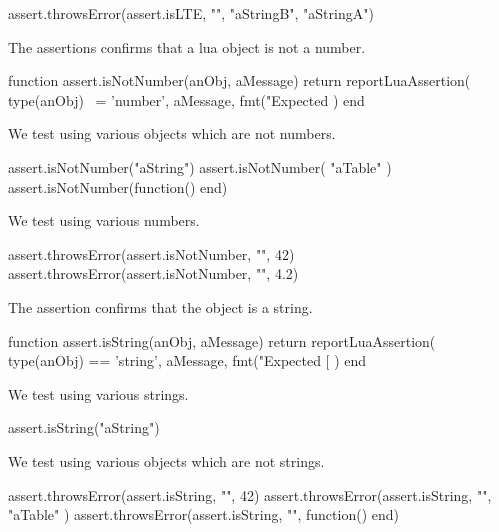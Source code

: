 \startLuaTest
  assert.throwsError(assert.isLTE, "", "aStringB", "aStringA")
\stopLuaTest

\stopTestCase

\stopTestSuite


The  assertions confirms that a lua object is not 
a number. 

\startLuaCode
function assert.isNotNumber(anObj, aMessage)
  return reportLuaAssertion(
    type(anObj) ~= 'number',
    aMessage,
    fmt("Expected %
  )
end
\stopLuaCode


We test using various objects which are not numbers. 

\startLuaTest
  assert.isNotNumber("aString")
  assert.isNotNumber({ "aTable" })
  assert.isNotNumber(function() end)
\stopLuaTest
\stopTestCase


We test using various numbers.

\startLuaTest
  assert.throwsError(assert.isNotNumber, "", 42)
  assert.throwsError(assert.isNotNumber, "", 4.2)
\stopLuaTest
\stopTestCase

\stopTestSuite


The  assertion confirms that the object is a string. 

\startLuaCode
function assert.isString(anObj, aMessage)
  return reportLuaAssertion(
    type(anObj) == 'string',
    aMessage,
    fmt("Expected [%
  )
end
\stopLuaCode


We test using various strings.

\startLuaTest
  assert.isString("aString")
\stopLuaTest
\stopTestCase


We test using various objects which are not strings. 

\startLuaTest
  assert.throwsError(assert.isString, "", 42)
  assert.throwsError(assert.isString, "", { "aTable" })
  assert.throwsError(assert.isString, "", function() end)
\stopLuaTest
\stopTestCase


